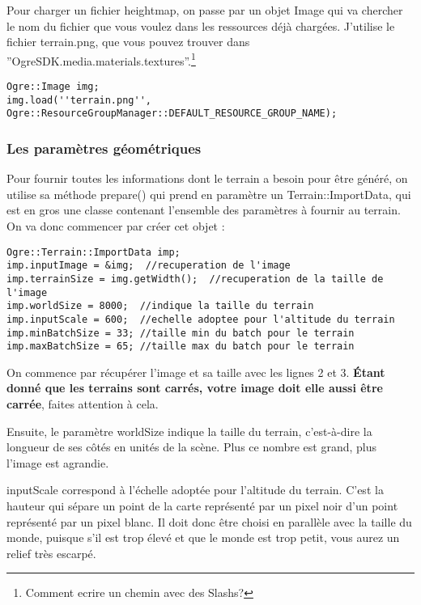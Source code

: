 \documentclass[10pt,a4paper]{report}
\begin{document}
Pour charger un fichier heightmap, on passe par un objet Image qui va chercher le nom du fichier que vous voulez dans les ressources d\'ej\`a charg\'ees. J'utilise le fichier terrain.png, que vous pouvez trouver dans ''OgreSDK.media.materials.textures''.\footnote{Comment ecrire un chemin avec des Slashs?}

\begin{lstlisting}[caption={Chargement du fichier heightmap}]
Ogre::Image img;
img.load(''terrain.png'', Ogre::ResourceGroupManager::DEFAULT_RESOURCE_GROUP_NAME);
\end{lstlisting}






\subsubsection{Les param\`etres g\'eom\'etriques}


Pour fournir toutes les informations dont le terrain a besoin pour \^etre g\'en\'er\'e, on utilise sa m\'ethode prepare() qui prend en param\`etre un Terrain::ImportData, qui est en gros une classe contenant l'ensemble des param\`etres \`a fournir au terrain. On va donc commencer par cr\'eer cet objet :

\begin{lstlisting}[caption={Cr\'eation de l'objet ImportData pour la d\'efinition des param\`etres \`a fournir au terrain}]
Ogre::Terrain::ImportData imp;
imp.inputImage = &img;  //recuperation de l'image
imp.terrainSize = img.getWidth();  //recuperation de la taille de l'image
imp.worldSize = 8000;  //indique la taille du terrain
imp.inputScale = 600;  //echelle adoptee pour l'altitude du terrain
imp.minBatchSize = 33; //taille min du batch pour le terrain
imp.maxBatchSize = 65; //taille max du batch pour le terrain
\end{lstlisting}

On commence par r\'ecup\'erer l'image et sa taille avec les lignes 2 et 3. \textbf{\'Etant donn\'e que les terrains sont carr\'es, votre image doit elle aussi \^etre carr\'ee}, faites attention \`a cela.

Ensuite, le param\`etre worldSize indique la taille du terrain, c'est-\`a-dire la longueur de ses c\^ot\'es en unit\'es de la sc\`ene. Plus ce nombre est grand, plus l'image est agrandie.

inputScale correspond \`a l'\'echelle adopt\'ee pour l'altitude du terrain. C'est la hauteur qui s\'epare un point de la carte repr\'esent\'e par un pixel noir d'un point repr\'esent\'e par un pixel blanc. Il doit donc \^etre choisi en parall\`ele avec la taille du monde, puisque s'il est trop \'elev\'e et que le monde est trop petit, vous aurez un relief tr\`es escarp\'e.
\end{document}
